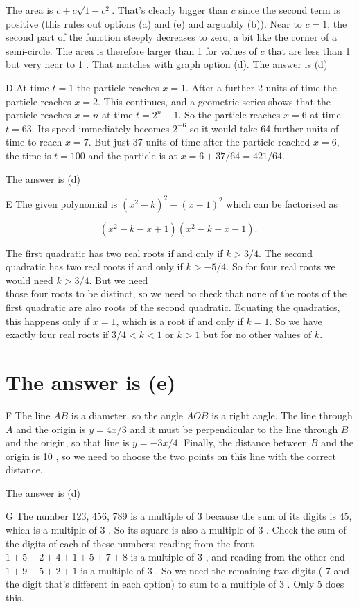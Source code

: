 \documentclass[10pt]{article}
\begin{document}
The area is $c+c \sqrt{1-c^{2}}$. That's clearly bigger than $c$ since the second term is positive (this rules out options (a) and (e) and arguably (b)). Near to $c=1$, the second part of the function steeply decreases to zero, a bit like the corner of a semi-circle. The area is therefore larger than 1 for values of $c$ that are less than 1 but very near to 1 . That matches with graph option (d). The answer is (d)

D At time $t=1$ the particle reaches $x=1$. After a further 2 units of time the particle reaches $x=2$. This continues, and a geometric series shows that the particle reaches $x=n$ at time $t=2^{n}-1$. So the particle reaches $x=6$ at time $t=63$. Its speed immediately becomes $2^{-6}$ so it would take 64 further units of time to reach $x=7$. But just 37 units of time after the particle reached $x=6$, the time is $t=100$ and the particle is at $x=6+37 / 64=421 / 64$.

The answer is (d)

E The given polynomial is $\left(x^{2}-k\right)^{2}-(x-1)^{2}$ which can be factorised as

$$
\left(x^{2}-k-x+1\right)\left(x^{2}-k+x-1\right) \text {. }
$$

The first quadratic has two real roots if and only if $k>3 / 4$. The second quadratic has two real roots if and only if $k>-5 / 4$. So for four real roots we would need $k>3 / 4$. But we need\\
those four roots to be distinct, so we need to check that none of the roots of the first quadratic are also roots of the second quadratic. Equating the quadratics, this happens only if $x=1$, which is a root if and only if $k=1$. So we have exactly four real roots if $3 / 4<k<1$ or $k>1$ but for no other values of $k$.

\section*{The answer is (e)}
F The line $A B$ is a diameter, so the angle $A O B$ is a right angle. The line through $A$ and the origin is $y=4 x / 3$ and it must be perpendicular to the line through $B$ and the origin, so that line is $y=-3 x / 4$. Finally, the distance between $B$ and the origin is 10 , so we need to choose the two points on this line with the correct distance.

The answer is (d)

G The number 123, 456, 789 is a multiple of 3 because the sum of its digits is 45, which is a multiple of 3 . So its square is also a multiple of 3 . Check the sum of the digits of each of these numbers; reading from the front $1+5+2+4+1+5+7+8$ is a multiple of 3 , and reading from the other end $1+9+5+2+1$ is a multiple of 3 . So we need the remaining two digits ( 7 and the digit that's different in each option) to sum to a multiple of 3 . Only 5 does this.
\end{document}
